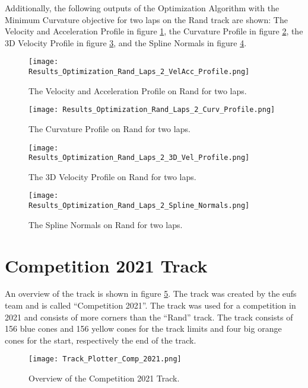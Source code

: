 Additionally, the following outputs of the Optimization Algorithm with the Minimum Curvature objective for two laps on the Rand track are shown: The Velocity and Acceleration Profile in figure \ref{fig:Results Rand Laps 2 VelAcc Profile}, the Curvature Profile in figure \ref{fig:Results Rand Laps 2 Curv Profile}, the 3D Velocity Profile in figure \ref{fig:Results Rand Laps 2 3D Vel Profile}, and the Spline Normals in figure \ref{fig:Results Rand Laps 2 Spline Normals}.
\begin{figure}[H]
    \centering
    \texttt{[image: Results\_Optimization\_Rand\_Laps\_2\_VelAcc\_Profile.png]}
    \caption{The Velocity and Acceleration Profile on Rand for two laps.}
    \label{fig:Results Rand Laps 2 VelAcc Profile}
\end{figure}
\begin{figure}[H]
    \centering
    \texttt{[image: Results\_Optimization\_Rand\_Laps\_2\_Curv\_Profile.png]}
    \caption{The Curvature Profile on Rand for two laps.}
    \label{fig:Results Rand Laps 2 Curv Profile}
\end{figure}
\begin{figure}[H]
    \centering
    \texttt{[image: Results\_Optimization\_Rand\_Laps\_2\_3D\_Vel\_Profile.png]}
    \caption{The 3D Velocity Profile on Rand for two laps.}
    \label{fig:Results Rand Laps 2 3D Vel Profile}
\end{figure}
\begin{figure}[H]
    \centering
    \texttt{[image: Results\_Optimization\_Rand\_Laps\_2\_Spline\_Normals.png]}
    \caption{The Spline Normals on Rand for two laps.}
    \label{fig:Results Rand Laps 2 Spline Normals}
\end{figure}

\section{Competition 2021 Track} \label{sec:Results Competition 2021 Track}
An overview of the track is shown in figure \ref{fig:Results Comp 2021 Initial}. The track was created by the \acrshort{eufs} team and is called ``Competition 2021''. \cite{eufs_sim_gitlab} The track was used for a competition in 2021 and consists of more corners than the ``Rand'' track. The track consists of 156 blue cones and 156 yellow cones for the track limits and four big orange cones for the start, respectively the end of the track.
\begin{figure}[H]
    \centering
    \texttt{[image: Track\_Plotter\_Comp\_2021.png]}
    \caption{Overview of the Competition 2021 Track.}
    \label{fig:Results Comp 2021 Initial}
\end{figure}

